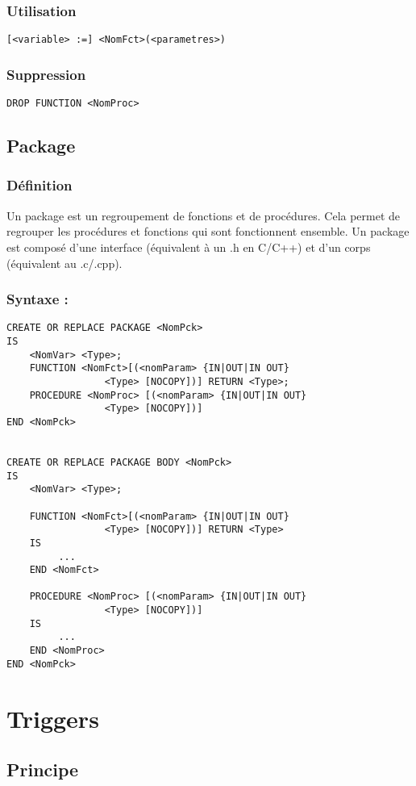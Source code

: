 \documentclass[10pt,a4paper,twoside]{article}
\begin{document}
\subsubsection{Utilisation}
\verb$[<variable> :=] <NomFct>(<parametres>)$

\subsubsection{Suppression}
\verb=DROP FUNCTION <NomProc>=


\subsection{Package}
\subsubsection{Définition} 
Un package est un regroupement de fonctions et de procédures. Cela permet de regrouper les procédures et fonctions qui sont fonctionnent ensemble. Un package est composé d'une interface (équivalent à un .h en C/C++) et d'un corps (équivalent au .c/.cpp).

\subsubsection{Syntaxe :}
\begin{verbatim}
CREATE OR REPLACE PACKAGE <NomPck>
IS
    <NomVar> <Type>;
    FUNCTION <NomFct>[(<nomParam> {IN|OUT|IN OUT}
                 <Type> [NOCOPY])] RETURN <Type>;
    PROCEDURE <NomProc> [(<nomParam> {IN|OUT|IN OUT} 
                 <Type> [NOCOPY])]
END <NomPck>


CREATE OR REPLACE PACKAGE BODY <NomPck>
IS
    <NomVar> <Type>;
    
    FUNCTION <NomFct>[(<nomParam> {IN|OUT|IN OUT}
                 <Type> [NOCOPY])] RETURN <Type> 
    IS
         ...
    END <NomFct>
    
    PROCEDURE <NomProc> [(<nomParam> {IN|OUT|IN OUT} 
                 <Type> [NOCOPY])]
    IS
         ...
    END <NomProc>
END <NomPck>
\end{verbatim}

\section{Triggers}
\subsection{Principe}
\end{document}
